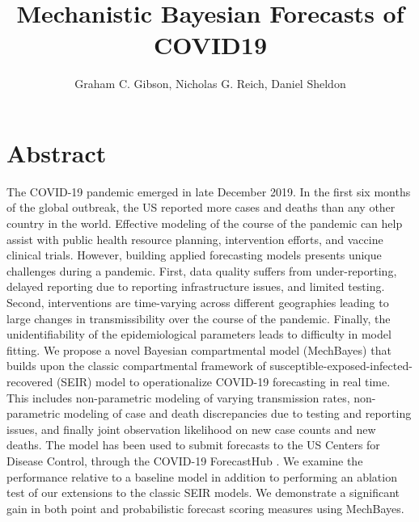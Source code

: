 \documentclass[11pt]{amsart}
\title{Mechanistic Bayesian Forecasts of COVID19}
\author{Graham C. Gibson, Nicholas G. Reich, Daniel Sheldon}
\begin{document}
\tableofcontents


\maketitle

\section*{Abstract}

The COVID-19 pandemic emerged in late December 2019. In the first six months of the global outbreak, the US reported more cases and deaths than any other country in the world. Effective modeling of the course of the pandemic can help assist with public health resource planning, intervention efforts, and vaccine clinical trials. However, building applied forecasting models presents unique challenges during a pandemic. First, data quality suffers from under-reporting, delayed reporting due to reporting infrastructure issues, and limited testing. Second, interventions are time-varying across different geographies leading to large changes in transmissibility over the course of the pandemic. Finally, the unidentifiability of the epidemiological parameters leads to difficulty in model fitting. We propose a novel Bayesian compartmental model (MechBayes) that builds upon the classic compartmental framework of susceptible-exposed-infected-recovered (SEIR) model to operationalize COVID-19 forecasting in real time. This includes non-parametric modeling of varying transmission rates, non-parametric modeling of case and death discrepancies due to testing and reporting issues, and finally joint observation likelihood on new case counts and new deaths. The model has been used to submit forecasts to the US Centers for Disease Control, through the COVID-19 ForecastHub \cite{covidhub}.  We examine the performance relative to a baseline model in addition to performing an ablation test of our extensions to the classic SEIR models. We demonstrate a significant gain in both point and probabilistic forecast scoring measures using MechBayes.
\end{document}
